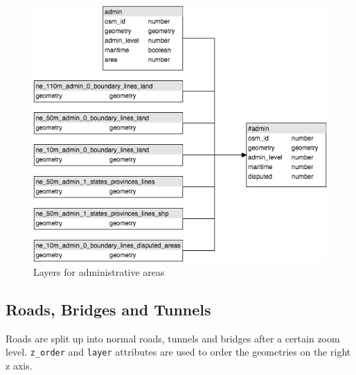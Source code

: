 \begin{figure}[h]
  \centering
  \includegraphics[scale=0.6]{images/admin_layer.png}
  \caption{Layers for administrative areas}
\end{figure}

\newpage
\subsection{Roads, Bridges and Tunnels}
Roads are split up into normal roads, tunnels and bridges after a certain zoom level. \texttt{z\_order} and \texttt{layer} attributes are used to order the geometries on the right z axis.

